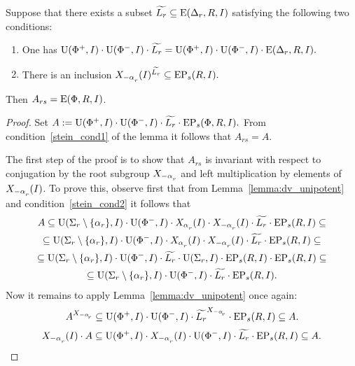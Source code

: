 \begin{lemma}\label{Stein_reduction} 
Suppose that there exists a subset $\widetilde{L_r} \subseteq \operatorname{E}(\Delta_r, R, I)$ satisfying the following two conditions:
\begin{enumerate}[label=(\alph*)] 
 \item\label{stein_cond1} One has $\operatorname{U}(\Phi^+, I)\cdot \operatorname{U}(\Phi^-, I) \cdot \widetilde{L_r} = \operatorname{U}(\Phi^+, I)\cdot \operatorname{U}(\Phi^-, I) \cdot \operatorname{E}(\Delta_r, R, I).$
 \item\label{stein_cond2} There is an inclusion $X_{-\alpha\ssub{r}}(I)^{\widetilde{L_r}} \subseteq \EP_s(R, I).$
\end{enumerate}
Then $A_{rs} = \operatorname{E}(\Phi, R, I)$. \end{lemma}
\begin{proof} Set $A:=\operatorname{U}(\Phi^+, I)\cdot \operatorname{U}(\Phi^-, I) \cdot \widetilde{L_r} \cdot \operatorname{EP}_s(\Phi, R, I).$
From condition~\ref{stein_cond1} of the lemma it follows that $A_{rs}=A$.

The first step of the proof is to show that $A_{rs}$ is invariant with respect to conjugation by the root subgroup $X_{-\alpha\ssub{r}}$ 
and left multiplication by elements of $X_{-\alpha\ssub{r}}(I)$. To prove this, observe first that from Lemma~\ref{lemma:dv_unipotent} and condition~\ref{stein_cond2} it follows that
\begin{multline}\nonumber 
A \subseteq \U(\Sigma_r\setminus \{\alpha_r\}, I) \cdot \U(\Phi^-, I) \cdot X_{\alpha\ssub{r}}(I) \cdot X_{-\alpha\ssub{r}}(I) \cdot \widetilde{L_r} \cdot \EP_s(R, I) \subseteq \\ 
\subseteq \U(\Sigma_r\setminus\{\alpha_r\}, I) \cdot \U(\Phi^-, I) \cdot X_{\alpha\ssub{r}}(I) \cdot X_{-\alpha\ssub{r}}(I) \cdot \widetilde{L_r} \cdot \EP_s(R, I) \subseteq \\
\subseteq \U(\Sigma_r\setminus\{\alpha_r\}, I) \cdot \U(\Phi^-, I) \cdot \widetilde{L_r} \cdot \U(\Sigma_r, I) \cdot \EP_s(R, I)  \cdot \EP_s(R, I) \subseteq \\
\subseteq \U(\Sigma_r\setminus\{\alpha_r\}, I) \cdot \U(\Phi^-, I) \cdot \widetilde{L_r} \cdot \EP_s(R, I). \end{multline}
Now it remains to apply Lemma~\ref{lemma:dv_unipotent} once again:
\begin{equation}\nonumber A^{X_{-\alpha\ssub{r}}} \subseteq \U(\Phi^+, I) \cdot \U(\Phi^-, I) \cdot \widetilde{L_r} ^{X_{-\alpha\ssub{r}}} \cdot \EP_s(R, I) \subseteq A. \end{equation}
\begin{equation}\nonumber X_{-\alpha\ssub{r}}(I) \cdot A \subseteq \U(\Phi^+, I) \cdot X_{-\alpha\ssub{r}}(I) \cdot \U(\Phi^-, I) \cdot \widetilde{L_r} \cdot \EP_s(R, I) \subseteq A. \end{equation}


\end{proof}
